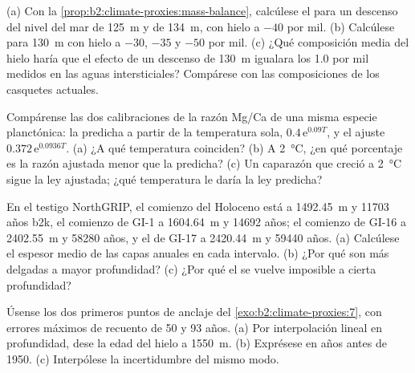 \begin{exercise}[$\star\star$]\label{exo:b2:climate-proxies:5}
(a) Con la \cref{prop:b2:climate-proxies:mass-balance}, calcúlese el  para un descenso
del nivel del mar de \qty{125}{m} y de \qty{134}{m}, con hielo a $-40$ por mil. (b) Calcúlese para
\qty{130}{m} con hielo a $-30$, $-35$ y $-50$ por mil. (c) ¿Qué composición media del hielo
haría que el efecto de un descenso de \qty{130}{m} igualara los \num{1.0} por mil medidos en las aguas
intersticiales? Compárese con las composiciones de los casquetes actuales.
\end{exercise}

\begin{exercise}[$\star\star$]\label{exo:b2:climate-proxies:6}
Compárense las dos calibraciones de la razón Mg/Ca de una misma especie planctónica: la predicha a partir de la
temperatura sola, $0.4\,\mathrm{e}^{0.09T}$, y el ajuste $0.372\,\mathrm{e}^{0.0936T}$. (a) ¿A
qué temperatura coinciden? (b) A \qty{2}{\celsius}, ¿en qué porcentaje es la razón ajustada
menor que la predicha? (c) Un caparazón que creció a \qty{2}{\celsius} sigue la ley ajustada; ¿qué
temperatura le daría la ley predicha?
\end{exercise}

\begin{exercise}[$\star\star$]\label{exo:b2:climate-proxies:7}
En el testigo NorthGRIP, el comienzo del Holoceno está a \qty{1492.45}{m} y \num{11703} años
b2k, el comienzo de GI-1 a \qty{1604.64}{m} y \num{14692} años; el comienzo de GI-16 a
\qty{2402.55}{m} y \num{58280} años, y el de GI-17 a \qty{2420.44}{m} y \num{59440} años.
(a) Calcúlese el espesor medio de las capas anuales en cada intervalo. (b) ¿Por qué son más delgadas
a mayor profundidad? (c) ¿Por qué el  se vuelve imposible a cierta profundidad?
\end{exercise}

\begin{exercise}[$\star\star$]\label{exo:b2:climate-proxies:8}
Úsense los dos primeros puntos de anclaje del \cref{exo:b2:climate-proxies:7}, con errores máximos de recuento de 50
y 93 años. (a) Por interpolación lineal en profundidad, dese la edad del hielo a \qty{1550}{m}.
(b) Exprésese en años antes de 1950. (c) Interpólese la incertidumbre del mismo modo.
\end{exercise}

